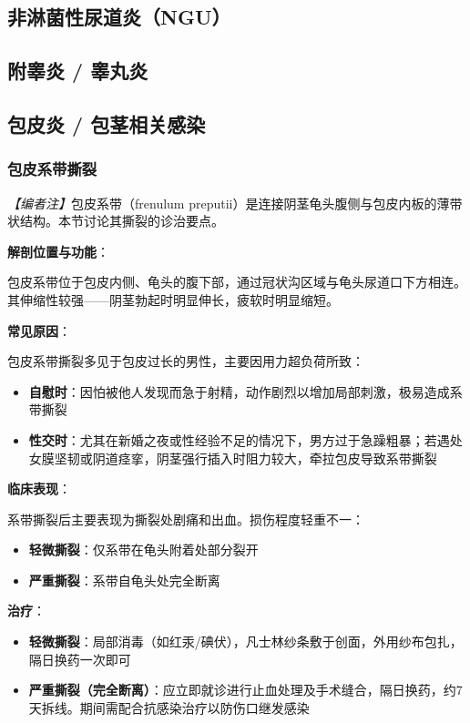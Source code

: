 \subsection{非淋菌性尿道炎（NGU）}
\subsection{附睾炎 / 睾丸炎}
\subsection{包皮炎 / 包茎相关感染}

\subsubsection{包皮系带撕裂}

\noindent\textit{【编者注】}包皮系带（frenulum preputii）是连接阴茎龟头腹侧与包皮内板的薄带状结构。本节讨论其撕裂的诊治要点。

\vspace{0.5em}
\noindent\textbf{解剖位置与功能}：

包皮系带位于包皮内侧、龟头的腹下部，通过冠状沟区域与龟头尿道口下方相连。其伸缩性较强——阴茎勃起时明显伸长，疲软时明显缩短。

\vspace{0.5em}
\noindent\textbf{常见原因}：

包皮系带撕裂多见于包皮过长的男性，主要因用力超负荷所致：
\begin{itemize}
	\item \textbf{自慰时}：因怕被他人发现而急于射精，动作剧烈以增加局部刺激，极易造成系带撕裂
	\item \textbf{性交时}：尤其在新婚之夜或性经验不足的情况下，男方过于急躁粗暴；若遇处女膜坚韧或阴道痉挛，阴茎强行插入时阻力较大，牵拉包皮导致系带撕裂
\end{itemize}

\vspace{0.5em}
\noindent\textbf{临床表现}：

系带撕裂后主要表现为撕裂处剧痛和出血。损伤程度轻重不一：
\begin{itemize}
	\item \textbf{轻微撕裂}：仅系带在龟头附着处部分裂开
	\item \textbf{严重撕裂}：系带自龟头处完全断离
\end{itemize}

\vspace{0.5em}
\noindent\textbf{治疗}：
\begin{itemize}
	\item \textbf{轻微撕裂}：局部消毒（如红汞/碘伏），凡士林纱条敷于创面，外用纱布包扎，隔日换药一次即可
	\item \textbf{严重撕裂（完全断离）}：应立即就诊进行止血处理及手术缝合，隔日换药，约7天拆线。期间需配合抗感染治疗以防伤口继发感染
\end{itemize}

